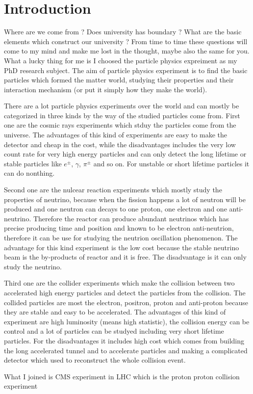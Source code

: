 \chapter*{Introduction}

Where are we come from ? Does university has boundary ? What are the basic elements which construct our university ? From time to time these questions will come to my mind and make me lost in the thought, maybe also the same for you.
What a lucky thing for me is I choosed the particle physics expreiment as my PhD research subject. The aim of particle physics experiment is to find the basic particles which formed the matter world, studying their properties and their interaction mechanism (or put it simply how they make the world).

There are a lot particle physics experiments over the world and can mostly be categorized in three kinds by the way of the studied particles come from.
First one are the cosmic rays experiments which stduy the particles come from the universe. The advantages of this kind of experiments are easy to make the detector and cheap in the cost, while the disadvantages includes the very low count rate for very high energy particles and can only detect the long lifetime or stable particles like $e^{\pm}$, $\gamma$, $\pi^{\pm}$ and so on. For unstable or short lifetime particles it can do nonthing.

Second one are the nulcear reaction experiments which mostly study the properties of neutrino, because when the fission happens a lot of neutron will be produced and one neutron can decays to one proton, one electron and one anti-neutrino. Therefore the reactor can produce abundant neutrinos which has precise producing time and position and known to be electron anti-neutrion, therefore it can be use for studying the neutrion oscillation phenomenon. The advantage for this kind experiment is the low cost because the stable neutrino beam is the by-products of reactor and it is free. The disadvantage is it can only study the neutrino.

Third one are the collider experiments which make the collision between two accelerated high energy particles and detect the particles from the collision. The collided particles are most the electron, positron, proton and anti-proton because they are stable and easy to be accelerated. The advantages of this kind of experiment are high luminosity (means high statistic), the collision energy can be control and a lot of particles can be studyed including very short lifetime particles. For the disadvantages it includes high cost which comes from building the long accelerated tunnel and to accelerate particles and making a complicated detector which used to reconstruct the whole collision event.

What I joined is CMS experiment in LHC which is the proton proton collision experiment
